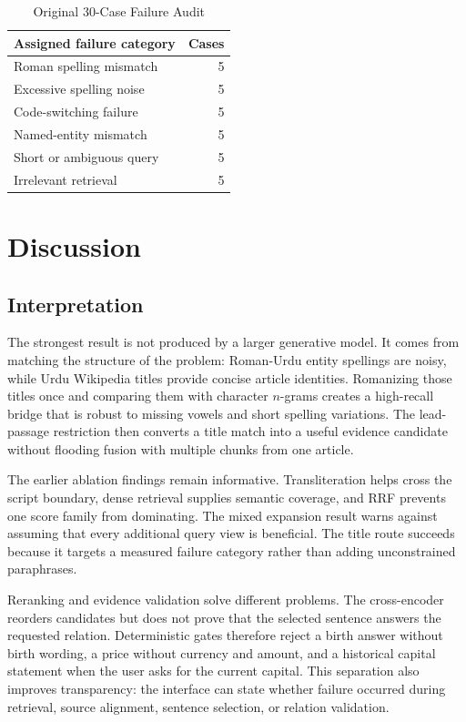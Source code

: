 \documentclass[conference]{IEEEtran}
\begin{document}
\begin{table}[t]
\caption{Original 30-Case Failure Audit}
\label{tab:failures}
\centering
\small
\begin{tabular}{@{}lr@{}}
\toprule
Assigned failure category & Cases \\
\midrule
Roman spelling mismatch & 5 \\
Excessive spelling noise & 5 \\
Code-switching failure & 5 \\
Named-entity mismatch & 5 \\
Short or ambiguous query & 5 \\
Irrelevant retrieval & 5 \\
\bottomrule
\end{tabular}
\end{table}

\section{Discussion}
\subsection{Interpretation}
The strongest result is not produced by a larger generative model. It comes from matching the structure of the problem: Roman-Urdu entity spellings are noisy, while Urdu Wikipedia titles provide concise article identities. Romanizing those titles once and comparing them with character $n$-grams creates a high-recall bridge that is robust to missing vowels and short spelling variations. The lead-passage restriction then converts a title match into a useful evidence candidate without flooding fusion with multiple chunks from one article.

The earlier ablation findings remain informative. Transliteration helps cross the script boundary, dense retrieval supplies semantic coverage, and RRF prevents one score family from dominating. The mixed expansion result warns against assuming that every additional query view is beneficial. The title route succeeds because it targets a measured failure category rather than adding unconstrained paraphrases.

Reranking and evidence validation solve different problems. The cross-encoder reorders candidates but does not prove that the selected sentence answers the requested relation. Deterministic gates therefore reject a birth answer without birth wording, a price without currency and amount, and a historical capital statement when the user asks for the current capital. This separation also improves transparency: the interface can state whether failure occurred during retrieval, source alignment, sentence selection, or relation validation.
\end{document}
